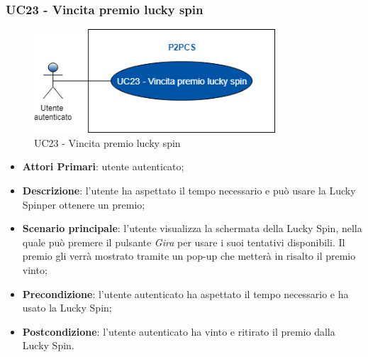 \subsubsection{UC23 - Vincita premio lucky spin}
\begin{figure}[h]
	\includegraphics[width=9cm]{res/images/uc21.png}
	\centering
	\caption{UC23 - Vincita premio lucky spin}
\end{figure}
\begin{itemize}
	\item \textbf{Attori Primari}: utente autenticato;
	\item \textbf{Descrizione}: l'utente ha aspettato il tempo necessario e può usare la Lucky Spin\glosp per ottenere un premio;	
	\item \textbf{Scenario principale}: l'utente visualizza la schermata della Lucky Spin, nella quale può premere il pulsante \textit{Gira} per usare i suoi tentativi disponibili. Il premio gli verrà mostrato tramite un pop-up che metterà in risalto il premio vinto;
	\item \textbf{Precondizione}: l'utente autenticato ha aspettato il tempo necessario e ha usato la Lucky Spin;
	\item \textbf{Postcondizione}: l'utente autenticato ha vinto e ritirato il premio dalla Lucky Spin.
\end{itemize}
